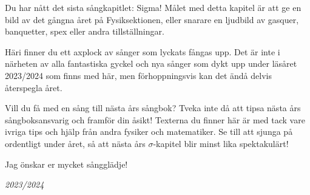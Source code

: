 \documentclass[a6paper, 10pt, twoside]{article}
\begin{document}
\noindent
{}
\small
\vspace{10pt}

\noindent
\small
Du har nått det sista sångkapitlet: Sigma! Målet med detta kapitel är att ge en bild av det gångna året på Fysiksektionen, eller snarare en ljudbild av gasquer, banquetter, spex eller andra tillställningar.  

Häri finner du ett axplock av sånger som lyckats fångas upp. Det är inte i närheten av alla fantastiska gyckel och nya sånger som dykt upp under läsåret 2023/2024 som finns med här, men förhoppningsvis kan det ändå delvis återspegla året. 

Vill du få med en sång till nästa års sångbok? Tveka inte då att tipsa nästa års sångboksansvarig och framför din åsikt! Texterna du finner här är med tack vare ivriga tips och hjälp från andra fysiker och matematiker. Se till att sjunga på ordentligt under året, så att nästa års $\sigma$-kapitel blir minst lika spektakulärt!

Jag önskar er mycket sångglädje!


\begin{center}
\huge{\textit{2023/2024}}
\end{center}
\end{document}
